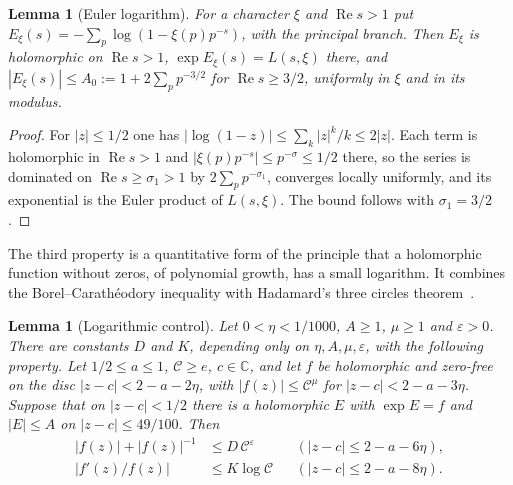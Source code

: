 \documentclass[11pt]{amsart}
\newtheorem{lemma}[theorem]{Lemma}
\theoremstyle{definition}
\theoremstyle{remark}
\numberwithin{equation}{section}
\newcommand{\R}{\operatorname{Re}}
\newcommand{\e}{e}
\begin{document}
\begin{lemma}[Euler logarithm]\label{lem:eulerlog}
For a character $\xi$ and $\R s>1$ put
$E_\xi(s)=-\sum_p\log(1-\xi(p)p^{-s})$, with the principal branch. Then $E_\xi$
is holomorphic on $\R s>1$, $\exp E_\xi(s)=L(s,\xi)$ there, and
$|E_\xi(s)|\le A_0:=1+2\sum_pp^{-3/2}$ for $\R s\ge3/2$, uniformly in $\xi$ and
in its modulus.
\end{lemma}

\begin{proof}
For $|z|\le1/2$ one has $|\log(1-z)|\le\sum_k|z|^k/k\le2|z|$. Each term is
holomorphic in $\R s>1$ and $|\xi(p)p^{-s}|\le p^{-\sigma}\le1/2$ there, so the
series is dominated on $\R s\ge\sigma_1>1$ by $2\sum_pp^{-\sigma_1}$, converges
locally uniformly, and its exponential is the Euler product of $L(s,\xi)$.
The bound follows with $\sigma_1=3/2$.
\end{proof}

The third property is a quantitative form of the principle that a holomorphic
function without zeros, of polynomial growth, has a small logarithm. It
combines the Borel--Carath\'eodory inequality with Hadamard's three circles
theorem~\cite[\S\S5.3, 5.5]{titchmarsh39}.

\begin{lemma}[Logarithmic control]\label{lem:logcontrol}
Let $0<\eta<1/1000$, $A\ge1$, $\mu\ge1$ and $\varepsilon>0$. There are
constants $D$ and $K$, depending only on $\eta,A,\mu,\varepsilon$, with the
following property. Let $1/2\le a\le1$, $\mathcal C\ge\e$, $c\in\mathbb C$, and let
$f$ be holomorphic and zero-free on the disc $|z-c|<2-a-2\eta$, with
$|f(z)|\le\mathcal C^\mu$ for $|z-c|<2-a-3\eta$. Suppose that on $|z-c|<1/2$ there
is a holomorphic $E$ with $\exp E=f$ and $|E|\le A$ on $|z-c|\le49/100$. Then
\begin{align*}
|f(z)|+|f(z)|^{-1}&\le D\,\mathcal C^{\varepsilon}&&(|z-c|\le2-a-6\eta),\\
|f'(z)/f(z)|&\le K\log\mathcal C&&(|z-c|\le2-a-8\eta).
\end{align*}
\end{lemma}
\end{document}
